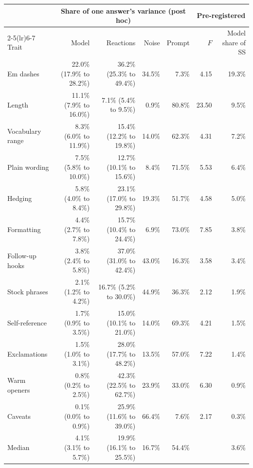 \begin{tabular}{lrrrrrr}
\toprule
& \multicolumn{4}{c}{Share of one answer's variance (post hoc)} & \multicolumn{2}{c}{Pre-registered} \\
\cmidrule(lr){2-5}\cmidrule(lr){6-7}
Trait & Model & Reactions & Noise & Prompt & $F$ & Model share of SS \\
\midrule
Em dashes & 22.0\% {\scriptsize (17.9\% to 28.2\%)} & 36.2\% {\scriptsize (25.3\% to 49.4\%)} & 34.5\% & 7.3\% & 4.15 & 19.3\% \\
Length & 11.1\% {\scriptsize (7.9\% to 16.0\%)} & 7.1\% {\scriptsize (5.4\% to 9.5\%)} & 0.9\% & 80.8\% & 23.50 & 9.5\% \\
Vocabulary range & 8.3\% {\scriptsize (6.0\% to 11.9\%)} & 15.4\% {\scriptsize (12.2\% to 19.8\%)} & 14.0\% & 62.3\% & 4.31 & 7.2\% \\
Plain wording & 7.5\% {\scriptsize (5.8\% to 10.0\%)} & 12.7\% {\scriptsize (10.1\% to 15.6\%)} & 8.4\% & 71.5\% & 5.53 & 6.4\% \\
Hedging & 5.8\% {\scriptsize (4.0\% to 8.4\%)} & 23.1\% {\scriptsize (17.0\% to 29.8\%)} & 19.3\% & 51.7\% & 4.58 & 5.0\% \\
Formatting & 4.4\% {\scriptsize (2.7\% to 7.8\%)} & 15.7\% {\scriptsize (10.4\% to 24.4\%)} & 6.9\% & 73.0\% & 7.85 & 3.8\% \\
Follow-up hooks & 3.8\% {\scriptsize (2.4\% to 5.8\%)} & 37.0\% {\scriptsize (31.0\% to 42.4\%)} & 43.0\% & 16.3\% & 3.58 & 3.4\% \\
Stock phrases & 2.1\% {\scriptsize (1.2\% to 4.2\%)} & 16.7\% {\scriptsize (5.2\% to 30.0\%)} & 44.9\% & 36.3\% & 2.12 & 1.9\% \\
Self-reference & 1.7\% {\scriptsize (0.9\% to 3.5\%)} & 15.0\% {\scriptsize (10.1\% to 21.0\%)} & 14.0\% & 69.3\% & 4.21 & 1.5\% \\
Exclamations & 1.5\% {\scriptsize (1.0\% to 3.1\%)} & 28.0\% {\scriptsize (17.7\% to 48.2\%)} & 13.5\% & 57.0\% & 7.22 & 1.4\% \\
Warm openers & 0.8\% {\scriptsize (0.2\% to 2.5\%)} & 42.3\% {\scriptsize (22.5\% to 62.7\%)} & 23.9\% & 33.0\% & 6.30 & 0.9\% \\
Caveats & 0.1\% {\scriptsize (0.0\% to 0.9\%)} & 25.9\% {\scriptsize (11.6\% to 39.0\%)} & 66.4\% & 7.6\% & 2.17 & 0.3\% \\
\midrule
Median & 4.1\% {\scriptsize (3.1\% to 5.7\%)} & 19.9\% {\scriptsize (16.1\% to 25.5\%)} & 16.7\% & 54.4\% & & 3.6\% \\
\bottomrule
\end{tabular}
